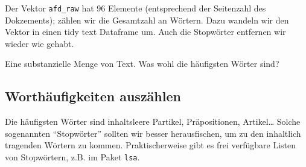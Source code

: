 \documentclass[12pt,ngerman,]{book}
\makeatletter
\newenvironment{Shaded}{\begin{snugshade}}{\end{snugshade}}
\newcommand{\KeywordTok}[1]{\textcolor[rgb]{0.13,0.29,0.53}{\textbf{{#1}}}}
\newcommand{\DataTypeTok}[1]{\textcolor[rgb]{0.13,0.29,0.53}{{#1}}}
\newcommand{\DecValTok}[1]{\textcolor[rgb]{0.00,0.00,0.81}{{#1}}}
\newcommand{\StringTok}[1]{\textcolor[rgb]{0.31,0.60,0.02}{{#1}}}
\newcommand{\CommentTok}[1]{\textcolor[rgb]{0.56,0.35,0.01}{\textit{{#1}}}}
\newcommand{\OtherTok}[1]{\textcolor[rgb]{0.56,0.35,0.01}{{#1}}}
\newcommand{\NormalTok}[1]{{#1}}
\newenvironment{kframe}{%
\medskip{}
\setlength{\fboxsep}{.8em}
 \def\at@end@of@kframe{}%
 \ifinner\ifhmode%
  \def\at@end@of@kframe{\end{minipage}}%
  \begin{minipage}{\columnwidth}%
 \fi\fi%
 \def\FrameCommand##1{\hskip\@totalleftmargin \hskip-\fboxsep
 \colorbox{shadecolor}{##1}\hskip-\fboxsep
     \hskip-\linewidth \hskip-\@totalleftmargin \hskip\columnwidth}%
 \MakeFramed {\advance\hsize-\width
   \@totalleftmargin\z@ \linewidth\hsize
   \@setminipage}}%
 {\par\unskip\endMakeFramed%
 \at@end@of@kframe}
\renewenvironment{Shaded}{\begin{kframe}}{\end{kframe}}
\makeatother
\begin{document}
Der Vektor \texttt{afd\_raw} hat 96 Elemente (entsprechend der
Seitenzahl des Dokzements); zählen wir die Gesamtzahl an Wörtern. Dazu
wandeln wir den Vektor in einen tidy text Dataframe um. Auch die
Stopwörter entfernen wir wieder wie gehabt.

\begin{Shaded}
\end{Shaded}

Eine substanzielle Menge von Text. Was wohl die häufigsten Wörter sind?

\subsection{Worthäufigkeiten
auszählen}\label{worthaufigkeiten-auszahlen}

\begin{Shaded}
\end{Shaded}

Die häufigsten Wörter sind inhaltsleere Partikel, Präpositionen,
Artikel\ldots{} Solche sogenannten ``Stopwörter'' sollten wir besser
herausfischen, um zu den inhaltlich tragenden Wörtern zu kommen.
Praktischerweise gibt es frei verfügbare Listen von Stopwörtern, z.B. im
Paket \texttt{lsa}.
\end{document}
